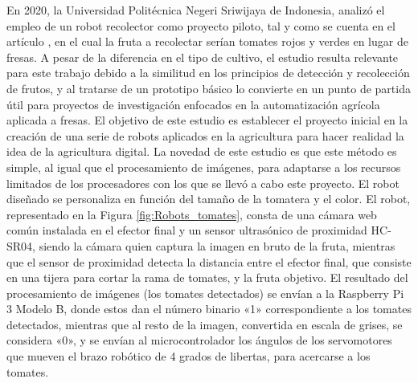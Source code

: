 En 2020, la Universidad Politécnica Negeri Sriwijaya de Indonesia, analizó el empleo de un robot recolector como proyecto piloto, tal y como se cuenta en el artículo \cite{Oktarina20}, en el cual la fruta a recolectar serían tomates rojos y verdes en lugar de fresas. A pesar de la diferencia en el tipo de cultivo, el estudio resulta relevante para este trabajo debido a la similitud en los principios de detección y recolección de frutos, y al tratarse de un prototipo básico lo convierte en un punto de partida útil para proyectos de investigación enfocados en la automatización agrícola aplicada a fresas. El objetivo de este estudio es establecer el proyecto inicial en la creación de una serie de robots aplicados en la agricultura para hacer realidad la idea de la agricultura digital. La novedad de este estudio es que este método es simple, al igual que el procesamiento de imágenes, para adaptarse a los recursos limitados de los procesadores con los que se llevó a cabo este proyecto. El robot diseñado se personaliza en función del tamaño de la tomatera y el color. %
El robot, representado en la Figura \ref{fig:Robots_tomates}, consta de una cámara web común instalada en el efector final y un sensor ultrasónico de proximidad HC-SR04, %
siendo la cámara quien captura la imagen en bruto de la fruta, mientras que el sensor de proximidad detecta la distancia entre el efector final, que consiste en una tijera para cortar la rama de tomates, y la fruta objetivo. %
El resultado del procesamiento de imágenes (los tomates detectados) se envían a la Raspberry Pi 3 Modelo B, donde estos dan el número binario «1» correspondiente a los tomates detectados, mientras que al resto de la imagen, convertida en escala de grises, se considera «0», y se envían al microcontrolador los ángulos de los servomotores que mueven el brazo robótico de 4 grados de libertas, para acercarse a los tomates. %

